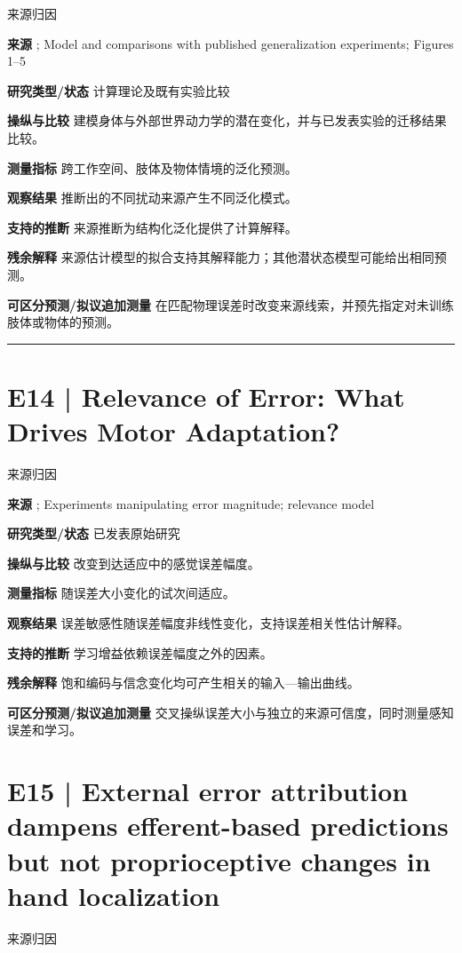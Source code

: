 \documentclass[11pt,a4paper]{article}
\begin{document}
{\small\sffamily\color{navy} 来源归因}\par
\textbf{来源} \cite{berniker2008}; Model and comparisons with published generalization experiments; Figures 1--5\par
\textbf{研究类型/状态} 计算理论及既有实验比较\par
\textbf{操纵与比较} 建模身体与外部世界动力学的潜在变化，并与已发表实验的迁移结果比较。\par
\textbf{测量指标} 跨工作空间、肢体及物体情境的泛化预测。\par
\textbf{观察结果} 推断出的不同扰动来源产生不同泛化模式。\par
\textbf{支持的推断} 来源推断为结构化泛化提供了计算解释。\par
\textbf{残余解释} 来源估计模型的拟合支持其解释能力；其他潜状态模型可能给出相同预测。\par
\textbf{可区分预测/拟议追加测量} 在匹配物理误差时改变来源线索，并预先指定对未训练肢体或物体的预测。\par
\bigskip\hrule\medskip\section{E14 | Relevance of Error: What Drives Motor Adaptation?}
{\small\sffamily\color{navy} 来源归因}\par
\textbf{来源} \cite{wei2009}; Experiments manipulating error magnitude; relevance model\par
\textbf{研究类型/状态} 已发表原始研究\par
\textbf{操纵与比较} 改变到达适应中的感觉误差幅度。\par
\textbf{测量指标} 随误差大小变化的试次间适应。\par
\textbf{观察结果} 误差敏感性随误差幅度非线性变化，支持误差相关性估计解释。\par
\textbf{支持的推断} 学习增益依赖误差幅度之外的因素。\par
\textbf{残余解释} 饱和编码与信念变化均可产生相关的输入---输出曲线。\par
\textbf{可区分预测/拟议追加测量} 交叉操纵误差大小与独立的来源可信度，同时测量感知误差和学习。\par
\clearpage\section{E15 | External error attribution dampens efferent-based predictions but not proprioceptive changes in hand localization}
{\small\sffamily\color{navy} 来源归因}\par
\end{document}
